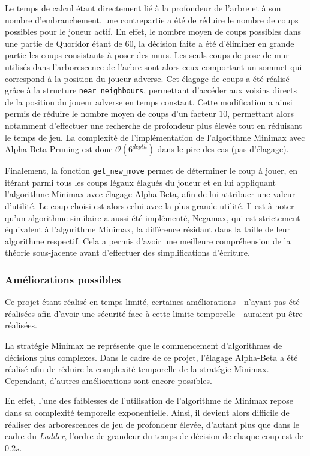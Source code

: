 \documentclass[11pt]{article}
\begin{document}
Le temps de calcul étant directement lié à la profondeur de l'arbre et à son nombre d'embranchement, une contrepartie a été de réduire le nombre de coups possibles pour le joueur actif. En effet, le nombre moyen de coups possibles dans une partie de Quoridor étant de $60$, la décision faite a été d'éliminer en grande partie les coups consistants à poser des murs. Les seuls coups de pose de mur utilisés dans l'arborescence de l'arbre sont alors ceux comportant un sommet qui correspond à la position du joueur adverse. Cet élagage de coups a été réalisé grâce à la structure \texttt{near\_neighbours}, permettant d'accéder aux voisins directs de la position du joueur adverse en temps constant. Cette modification a ainsi permis de réduire le nombre moyen de coups d'un facteur $10$, permettant alors notamment d'effectuer une recherche de profondeur plus élevée tout en réduisant le temps de jeu. La complexité de l'implémentation de l'algorithme Minimax avec Alpha-Beta Pruning est donc $\mathcal{O}(6^{depth})$ dans le pire des cas (pas d'élagage).

Finalement, la fonction \texttt{get\_new\_move} permet de déterminer le coup à jouer, en itérant parmi tous les coups légaux  élagués du joueur et en lui appliquant l'algorithme Minimax avec élagage Alpha-Beta, afin de lui attribuer une valeur d'utilité. Le coup choisi est alors celui avec la plus grande utilité. Il est à noter qu'un algorithme similaire a aussi été implémenté, Negamax, qui est strictement équivalent à l'algorithme Minimax, la différence résidant dans la taille de leur algorithme respectif. Cela a permis d'avoir une meilleure compréhension de la théorie sous-jacente avant d'effectuer des simplifications d'écriture.

\subsubsection{Améliorations possibles}

Ce projet étant réalisé en temps limité, certaines améliorations - n'ayant pas été réalisées afin d'avoir une sécurité face à cette limite temporelle - auraient pu être réalisées.

La stratégie Minimax ne représente que le commencement d'algorithmes de décisions plus complexes. Dans le cadre de ce projet, l'élagage Alpha-Beta a été réalisé afin de réduire la complexité temporelle de la stratégie Minimax. Cependant, d'autres améliorations sont encore possibles.

En effet, l'une des faiblesses de l'utilisation de l'algorithme de Minimax repose dans sa complexité temporelle exponentielle. Ainsi, il devient alors difficile de réaliser des arborescences de jeu de profondeur élevée, d'autant plus que dans le cadre du \textit{Ladder}, l'ordre de grandeur du temps de décision de chaque coup est de $0.2s$.
\end{document}
